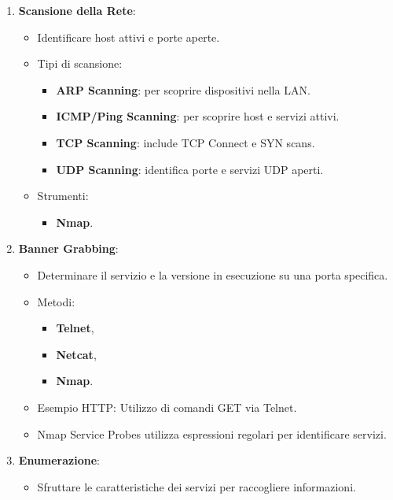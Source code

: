 \documentclass[12pt]{article}
\begin{document}
\begin{enumerate}
\begin{enumerate}
        \item \textbf{Scansione della Rete}:
        \begin{itemize}
            \item Identificare host attivi e porte aperte.
            \item Tipi di scansione:
            \begin{itemize}
                \item \textbf{ARP Scanning}: per scoprire dispositivi nella LAN.
                \item \textbf{ICMP/Ping Scanning}: per scoprire host e servizi attivi.
                \item \textbf{TCP Scanning}: include TCP Connect e SYN scans.
                \item \textbf{UDP Scanning}: identifica porte e servizi UDP aperti. 
            \end{itemize}
            \item Strumenti:
            \begin{itemize}
                \item \textbf{Nmap}.
            \end{itemize} 
        \end{itemize}
        \item \textbf{Banner Grabbing}:
        \begin{itemize}
            \item Determinare il servizio e la versione in esecuzione su una 
            porta specifica.
            \item Metodi:
            \begin{itemize}
                \item \textbf{Telnet},
                \item \textbf{Netcat},
                \item \textbf{Nmap}.
            \end{itemize} 
            \item Esempio HTTP: Utilizzo di comandi GET via Telnet.
            \item Nmap Service Probes utilizza espressioni regolari per 
            identificare servizi.
        \end{itemize}
        \item \textbf{Enumerazione}:
        \begin{itemize}
            \item Sfruttare le caratteristiche dei servizi per raccogliere 
            informazioni.

\end{itemize}
\end{enumerate}
\end{enumerate}
\end{document}
